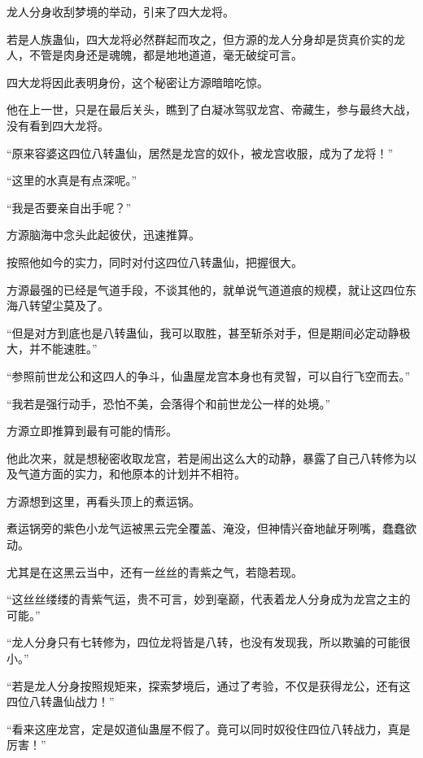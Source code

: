 
\begin{this_body}

龙人分身收刮梦境的举动，引来了四大龙将。

若是人族蛊仙，四大龙将必然群起而攻之，但方源的龙人分身却是货真价实的龙人，不管是肉身还是魂魄，都是地地道道，毫无破绽可言。

四大龙将因此表明身份，这个秘密让方源暗暗吃惊。

他在上一世，只是在最后关头，瞧到了白凝冰驾驭龙宫、帝藏生，参与最终大战，没有看到四大龙将。

“原来容婆这四位八转蛊仙，居然是龙宫的奴仆，被龙宫收服，成为了龙将！”

“这里的水真是有点深呢。”

“我是否要亲自出手呢？”

方源脑海中念头此起彼伏，迅速推算。

按照他如今的实力，同时对付这四位八转蛊仙，把握很大。

方源最强的已经是气道手段，不谈其他的，就单说气道道痕的规模，就让这四位东海八转望尘莫及了。

“但是对方到底也是八转蛊仙，我可以取胜，甚至斩杀对手，但是期间必定动静极大，并不能速胜。”

“参照前世龙公和这四人的争斗，仙蛊屋龙宫本身也有灵智，可以自行飞空而去。”

“我若是强行动手，恐怕不美，会落得个和前世龙公一样的处境。”

方源立即推算到最有可能的情形。

他此次来，就是想秘密收取龙宫，若是闹出这么大的动静，暴露了自己八转修为以及气道方面的实力，和他原本的计划并不相符。

方源想到这里，再看头顶上的煮运锅。

煮运锅旁的紫色小龙气运被黑云完全覆盖、淹没，但神情兴奋地龇牙咧嘴，蠢蠢欲动。

尤其是在这黑云当中，还有一丝丝的青紫之气，若隐若现。

“这丝丝缕缕的青紫气运，贵不可言，妙到毫巅，代表着龙人分身成为龙宫之主的可能。”

“龙人分身只有七转修为，四位龙将皆是八转，也没有发现我，所以欺骗的可能很小。”

“若是龙人分身按照规矩来，探索梦境后，通过了考验，不仅是获得龙公，还有这四位八转蛊仙战力！”

“看来这座龙宫，定是奴道仙蛊屋不假了。竟可以同时奴役住四位八转战力，真是厉害！”


\end{this_body}
